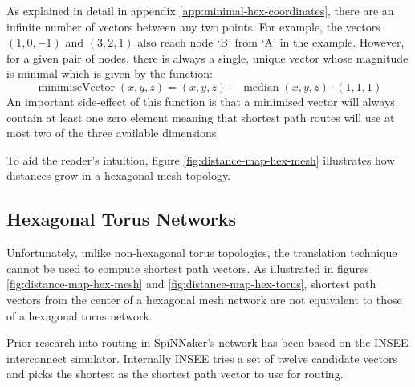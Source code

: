 			As explained in detail in appendix \ref{app:minimal-hex-coordinates},
			there are an infinite number of vectors between any two points. For
			example, the vectors $(1, 0, -1)$ and $(3, 2, 1)$ also reach node `B'
			from `A' in the example. However, for a given pair of nodes, there is
			always a single, unique vector whose magnitude is minimal which is
			given by the function:
			\begin{equation}
				\operatorname{minimiseVector}(x,y,z)
					= (x,y,z) - \operatorname{median}(x,y,z) \cdot (1,1,1)
			\end{equation}
			An important side-effect of this function is that a minimised vector will
			always contain at least one zero element meaning that shortest path
			routes will use at most two of the three available dimensions.
			
			To aid the reader's intuition, figure \ref{fig:distance-map-hex-mesh}
			illustrates how distances grow in a hexagonal mesh topology.
		
		\subsection{Hexagonal Torus Networks}
			
			Unfortunately, unlike non-hexagonal torus topologies, the translation
			technique cannot be used to compute shortest path vectors. As illustrated
			in figures \ref{fig:distance-map-hex-mesh} and
			\ref{fig:distance-map-hex-torus}, shortest path vectors from the center
			of a hexagonal mesh network are not equivalent to those of a hexagonal
			torus network.
			
			Prior research into routing in SpiNNaker's network has been based on the
			INSEE \cite{navaridas09,ghasempour15} interconnect simulator. Internally
			INSEE tries a set of twelve candidate vectors and picks the shortest as
			the shortest path vector to use for routing.
			
